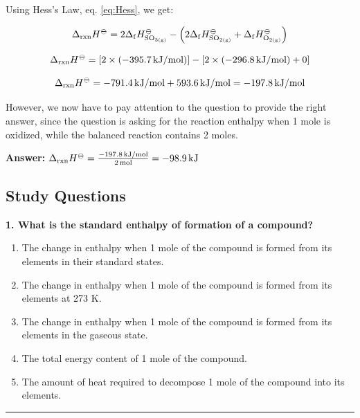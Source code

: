 \documentclass[
  9pt,
]{extbook}
\providecommand{\tightlist}{%
  \setlength{\itemsep}{0pt}\setlength{\parskip}{0pt}}
\theoremstyle{definition}
\theoremstyle{definition}
\theoremstyle{definition}
\theoremstyle{definition}
\theoremstyle{remark}
\begin{document}
Using Hess's Law, eq. \eqref{eq:Hess}, we get:

\[\Delta_{\text{rxn}} H^{-\kern-6pt{\ominus}\kern-6pt-}= 2 \Delta_{\mathrm{f}} H_{\text{SO}_{3\text{(g)}}}^{-\kern-6pt{\ominus}\kern-6pt-}- \left(2\Delta_{\mathrm{f}} H_{\text{SO}_{2\text{(g)}}}^{-\kern-6pt{\ominus}\kern-6pt-}+\Delta_{\mathrm{f}} H_{\text{O}_{2\text{(g)}}}^{-\kern-6pt{\ominus}\kern-6pt-}\right)\]

\[\Delta_{\text{rxn}} H^{-\kern-6pt{\ominus}\kern-6pt-}= \left[2 \times \left(-395.7 \, \text{kJ/mol}\right)\right] - \left[2 \times \left(-296.8 \, \text{kJ/mol}\right) + 0\right]\]

\[\Delta_{\text{rxn}} H^{-\kern-6pt{\ominus}\kern-6pt-}= -791.4 \, \text{kJ/mol} + 593.6 \, \text{kJ/mol} = -197.8 \, \text{kJ/mol}\]

However, we now have to pay attention to the question to provide the right answer, since the question is asking for the reaction enthalpy when 1 mole is oxidized, while the balanced reaction contains 2 moles.

\textbf{Answer:} \(\Delta_{\text{rxn}} H^{-\kern-6pt{\ominus}\kern-6pt-}= \frac{-197.8 \, \text{kJ/mol}}{2\,\text{mol}} = -98.9 \, \text{kJ}\)

\subsection{Study Questions}\label{quest4}

\textbf{1. What is the standard enthalpy of formation of a compound?}

\begin{enumerate}
\def\labelenumi{\alph{enumi}.}
\tightlist
\item
  The change in enthalpy when 1 mole of the compound is formed from its elements in their standard states.
\item
  The change in enthalpy when 1 mole of the compound is formed from its elements at 273 K.
\item
  The change in enthalpy when 1 mole of the compound is formed from its elements in the gaseous state.
\item
  The total energy content of 1 mole of the compound.
\item
  The amount of heat required to decompose 1 mole of the compound into its elements.
\end{enumerate}

\begin{center}\rule{0.5\linewidth}{0.5pt}\end{center}
\end{document}
